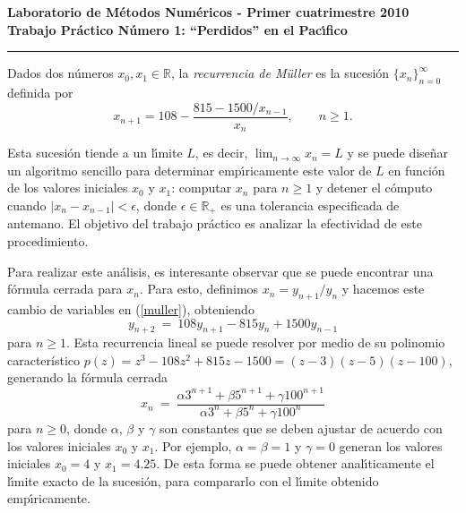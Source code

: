 
%

\begin{centering}
\bf Laboratorio de M\'etodos Num\'ericos - Primer cuatrimestre 2010 \\
\bf Trabajo Pr\'actico N\'umero 1: ``Perdidos'' en el Pac\'\i fico \\
\end{centering}

\vskip 25pt
\hrule
\vskip 11pt

Dados dos n\'umeros $x_0, x_1\in\mathbb{R}$, la \emph{recurrencia de M\"uller} es la sucesi\'on $\{x_n\}_{n=0}^{\infty}$ definida por 
\begin{equation}
 x_{n+1} = 108 - \frac{815 - 1500/x_{n-1}}{x_n}, \label{muller} \qquad n\ge 1.
\end{equation}

Esta sucesi\'on tiende a un l\'\i mite $L$, es decir, $\lim_{n\to\infty} x_n = L$ y se puede dise\~nar un algoritmo sencillo para determinar emp\'\i ricamente este valor de $L$ en funci\'on de los valores iniciales $x_0$ y $x_1$: computar $x_n$ para $n\ge 1$ y detener el c\'omputo cuando $|x_n-x_{n-1}| < \epsilon$, donde $\epsilon\in\mathbb{R}_+$ es una tolerancia especificada de antemano. El objetivo del trabajo pr\'actico es analizar la efectividad de este procedimiento.

Para realizar este an\'alisis, es interesante observar que se puede encontrar una f\'ormula cerrada para $x_n$. Para esto, definimos $x_n = y_{n+1} / y_n$ y hacemos este cambio de variables en (\ref{muller}), obteniendo
\begin{displaymath}
y_{n+2} \ =\ 108 y_{n+1} - 815 y_n + 1500 y_{n-1}
\end{displaymath}
para $n\ge 1$. Esta recurrencia lineal se puede resolver por medio de su polinomio caracter\'istico $p(z) = z^3 - 108 z^2 + 815 z - 1500 = (z-3)(z-5)(z-100)$, generando la f\'ormula cerrada
\begin{displaymath}
x_n \ =\ \frac{\alpha 3^{n+1} + \beta 5^{n+1} + \gamma 100^{n+1}}{\alpha 3^n + \beta 5^n + \gamma 100^n}
\end{displaymath}
para $n\ge 0$, donde $\alpha$, $\beta$ y $\gamma$ son constantes que se deben ajustar de acuerdo con los valores iniciales $x_0$ y $x_1$. Por ejemplo, $\alpha = \beta = 1$ y $\gamma = 0$ generan los valores iniciales $x_0 = 4$ y $x_1 = 4.25$. De esta forma se puede obtener anal\'\i ticamente el l\'\i mite exacto de la sucesi\'on, para compararlo con el l\'\i mite obtenido emp\'\i ricamente.


